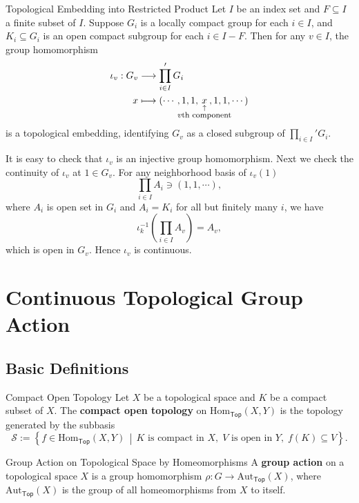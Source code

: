 \documentclass{report}
\newcommand{\midv}{\,\middle\vert\,}
\begin{document}
\begin{example}{Topological Embedding into Restricted Product}{}
	Let \( I \) be an index set and \( F\subseteq I \) a finite subset of \( I \). Suppose \( G_i \) is a locally compact group for each \( i \in I \), and \( K_i \subseteq G_i \) is an open compact subgroup for each \( i \in I - F \). Then for any $v\in I$, the group homomorphism
	\begin{align*}
		\iota_v:G_v &\longrightarrow \prod_{i\in I}' G_i \\
		x &\longmapsto (\cdots, 1, 1, \underset{\hspace{-2.3em} \substack{\uparrow \\ \text{\footnotesize $v$th component}}\hspace{-2.3em}}{x},
		1, 1,  \cdots)
	\end{align*}
	is a topological embedding, identifying $G_v$ as a closed subgroup of $\prod_{i\in I}' G_i$.
\end{example}
\begin{prf}
	It is easy to check that $\iota_v$ is an injective group homomorphism. Next we check the continuity of $\iota_v$ at $1\in G_v$. For any neighborhood basis of $\iota_v(1)$
	\[
		\prod_{i\in I} A_i\ni (1,1,\cdots),
	\]
	where $A_i$ is open set in $G_i$ and $A_i=K_i$ for all but finitely many $i$, we have
	\[
		\iota_k^{-1}\left(\prod_{i\in I} A_v\right)=A_v,
	\]
	which is open in $G_v$. Hence $\iota_v$ is continuous. 
\end{prf}



\section{Continuous Topological Group Action}
\subsection{Basic Definitions}
\begin{definition}{Compact Open Topology}{}
	Let $X$ be a topological space and $K$ be a compact subset of $X$. The \textbf{compact open topology} on $\mathrm{Hom}_{\mathsf{Top}}(X,Y)$ is the topology generated by the subbasis
	\[
		\mathcal{S}:=\left\{f\in \mathrm{Hom}_{\mathsf{Top}}(X,Y)\midv K\text{ is compact in }X,\;V\text{ is open in }Y,\;f(K)\subseteq V\right\}.
	\]
\end{definition}


\begin{definition}{Group Action on Topological Space by Homeomorphisms}{}
	A \textbf{group action} on a topological space $X$ is a group homomorphism $\rho:G\to \mathrm{Aut}_{\mathsf{Top}}(X)$, where $\mathrm{Aut}_{\mathsf{Top}}(X)$ is the group of all homeomorphisms from $X$ to itself.
\end{definition}
\end{document}
